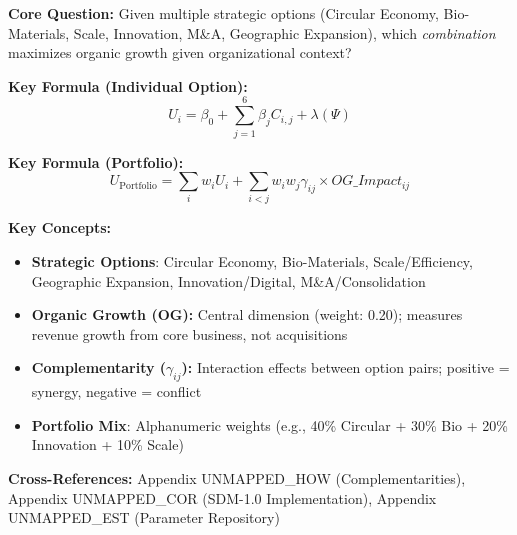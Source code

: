 \begin{tcolorbox}[colback=blue!5!white, colframe=blue!75!black,
    title=Quick Reference: Strategy Option Comparison Model v1.0]

\textbf{Core Question:} Given multiple strategic options (Circular Economy, Bio-Materials, Scale, Innovation, M\&A, Geographic Expansion), which \textit{combination} maximizes organic growth given organizational context?

\textbf{Key Formula (Individual Option):}
\begin{equation}
U_i = \beta_0 + \sum_{j=1}^{6} \beta_j C_{i,j} + \lambda(\Psi)
\end{equation}

\textbf{Key Formula (Portfolio):}
\begin{equation}
U_{\text{Portfolio}} = \sum_{i} w_i U_i + \sum_{i<j} w_i w_j \gamma_{ij} \times OG\_Impact_{ij}
\end{equation}

\textbf{Key Concepts:}
\begin{itemize}[nosep]
\item \textbf{Strategic Options}: Circular Economy, Bio-Materials, Scale/Efficiency, Geographic Expansion, Innovation/Digital, M\&A/Consolidation
\item \textbf{Organic Growth (OG):} Central dimension (weight: 0.20); measures revenue growth from core business, not acquisitions
\item \textbf{Complementarity ($\gamma_{ij}$):} Interaction effects between option pairs; positive = synergy, negative = conflict
\item \textbf{Portfolio Mix}: Alphanumeric weights (e.g., 40\% Circular + 30\% Bio + 20\% Innovation + 10\% Scale)
\end{itemize}

\textbf{Cross-References:} Appendix UNMAPPED_HOW (Complementarities), Appendix UNMAPPED_COR (SDM-1.0 Implementation), Appendix UNMAPPED_EST (Parameter Repository)

\end{tcolorbox}



